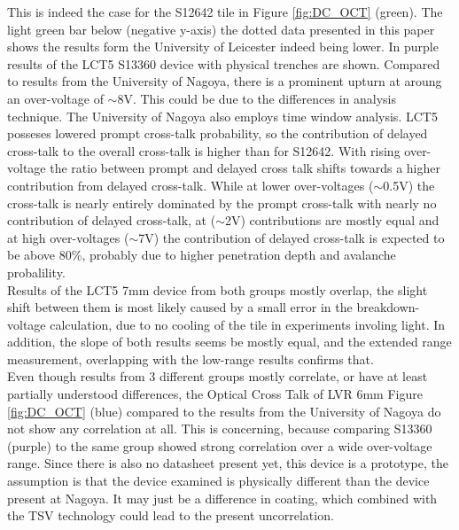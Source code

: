 \documentclass[12pt,article,type=msc,colorback,accentcolor=tud9c]{tudthesis}
\begin{document}
This is indeed the case for the S12642 tile in Figure \ref{fig:DC_OCT} (green). The light green bar below (negative y-axis) the dotted data presented in this paper shows the results form the University of Leicester indeed being lower. In purple results of the LCT5 S13360 device with physical trenches are shown. Compared to results from the University of Nagoya, there is a prominent upturn at aroung an over-voltage of $\sim$8V. This could be due to the differences in analysis technique. The University of Nagoya also employs time window analysis. LCT5 posseses lowered prompt cross-talk probability, so the contribution of delayed cross-talk to the overall cross-talk is higher than for S12642. With rising over-voltage the ratio between prompt and delayed cross talk shifts towards a higher contribution from delayed cross-talk\cite{DelayedOCT}\cite{Yamamoto}. While at lower over-voltages ($\sim$0.5V) the cross-talk is nearly entirely dominated by the prompt cross-talk with nearly no contribution of delayed cross-talk, at ($\sim$2V) contributions are mostly equal and at high over-voltages ($\sim$7V) the contribution of delayed cross-talk is expected to be above 80\%, probably due to higher penetration depth and avalanche probalility.\\
Results of the LCT5 7mm device from both groups mostly overlap, the slight shift between them is most likely caused by a small error in the breakdown-voltage calculation, due to no cooling of the tile in experiments involing light. In addition, the slope of both results seems be mostly equal, and the extended range measurement, overlapping with the low-range results confirms that.\\
Even though results from 3 different groups mostly correlate, or have at least partially understood differences, the Optical Cross Talk of LVR 6mm Figure \ref{fig:DC_OCT} (blue) compared to the results from the University of Nagoya do not show any correlation at all. This is concerning, because comparing S13360 (purple) to the same group showed strong correlation over a wide over-voltage range. Since there is also no datasheet present yet, this device is a prototype, the assumption is that the device examined is physically different than the device present at Nagoya. It may just be a difference in coating, which combined with the TSV technology could lead to the present uncorrelation\cite{Yamamoto}.






\end{document}
